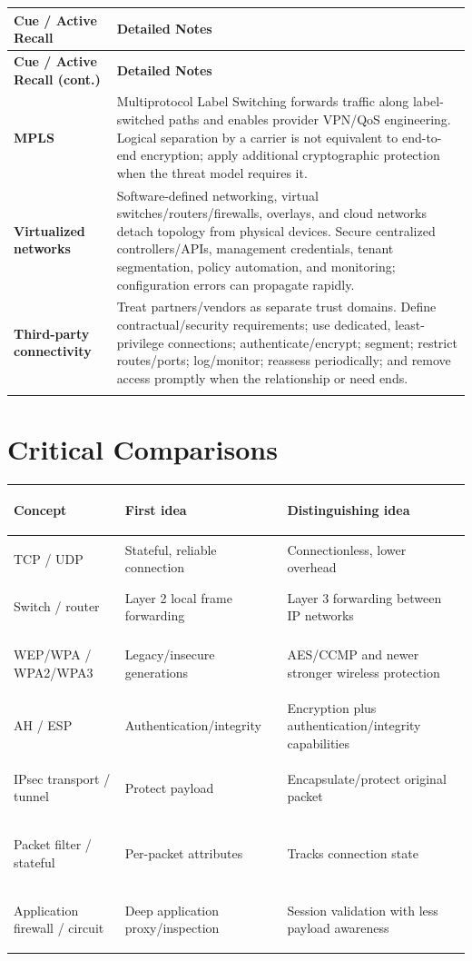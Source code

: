 \documentclass[10pt,letterpaper]{article}
\makeatletter
\newenvironment{cornell}{\rowcolors{2}{white}{notebg}\begin{longtable}{@{}>{\raggedright\arraybackslash\columncolor{cuebg}\color{navy}\bfseries}p{0.285\textwidth}>{\raggedright\arraybackslash}p{0.65\textwidth}@{}}\rowcolor{navy}\color{white}\textbf{Cue / Active Recall} & \color{white}\textbf{Detailed Notes}\\ \hline\endfirsthead\rowcolor{navy}\color{white}\textbf{Cue / Active Recall (cont.)} & \color{white}\textbf{Detailed Notes}\\ \hline\endhead}{\end{longtable}}
\newcommand{\noterow}[2]{#1 & #2\\\arrayrulecolor{line}\hline}\newcommand{\source}[1]{\par{\footnotesize\color{teal}\textit{Source: CBK, #1}}\par}
\makeatother
\begin{document}
\begin{cornell}
\noterow{MPLS}{Multiprotocol Label Switching forwards traffic along label-switched paths and enables provider VPN/QoS engineering. Logical separation by a carrier is not equivalent to end-to-end encryption; apply additional cryptographic protection when the threat model requires it.}
\noterow{Virtualized networks}{Software-defined networking, virtual switches/routers/firewalls, overlays, and cloud networks detach topology from physical devices. Secure centralized controllers/APIs, management credentials, tenant segmentation, policy automation, and monitoring; configuration errors can propagate rapidly.}
\noterow{Third-party connectivity}{Treat partners/vendors as separate trust domains. Define contractual/security requirements; use dedicated, least-privilege connections; authenticate/encrypt; segment; restrict routes/ports; log/monitor; reassess periodically; and remove access promptly when the relationship or need ends.}
\end{cornell}

\section{\color{navy}Critical Comparisons}
\begin{center}\small
\begin{tabularx}{\textwidth}{>{\bfseries\color{navy}\raggedright\arraybackslash}p{}>{\raggedright\arraybackslash}X>{\raggedright\arraybackslash}X}
\toprule Concept & First idea & Distinguishing idea\\\midrule
TCP / UDP & Stateful, reliable connection & Connectionless, lower overhead\\
Switch / router & Layer 2 local frame forwarding & Layer 3 forwarding between IP networks\\
WEP/WPA / WPA2/WPA3 & Legacy/insecure generations & AES/CCMP and newer stronger wireless protection\\
AH / ESP & Authentication/integrity & Encryption plus authentication/integrity capabilities\\
IPsec transport / tunnel & Protect payload & Encapsulate/protect original packet\\
Packet filter / stateful & Per-packet attributes & Tracks connection state\\
Application firewall / circuit & Deep application proxy/inspection & Session validation with less payload awareness\\
\bottomrule
\end{tabularx}
\end{center}
\end{document}
